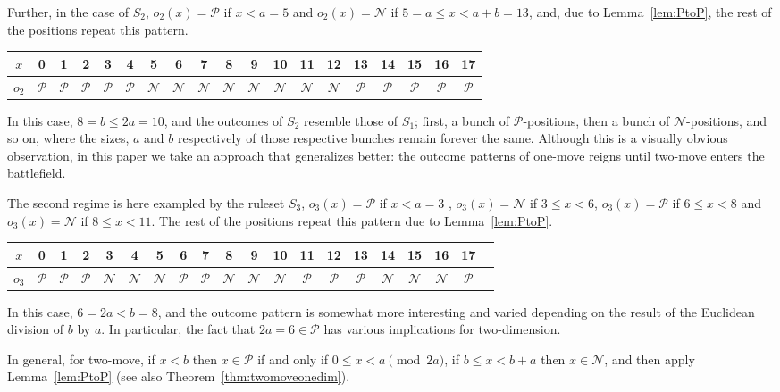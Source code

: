 \documentclass{amsart}
\theoremstyle{plain}
\theoremstyle{definition}
\newcommand{\N}{\ensuremath{\mathcal N}}
\renewcommand{\P}{\ensuremath{\mathcal P}}
\renewcommand{\le}{\leqslant}
\begin{document}
Further, in the case of $S_2$, $o_2(x) = \P$ if $x < a=5$ and $o_2(x) =\N $ if $5=a \le x < a+b=13$, and, due to Lemma~\ref{lem:PtoP},  the rest of the positions repeat this pattern.\vspace{2 mm} 
{\small
\begin{center}
\begin{tabular}{|c|c|c|c|c|c|c|c|c|c|c|c|c|c|c|c|c|c|c|}
\hline
 $x$ & 0 & 1 & 2 & 3 & 4 & 5 & 6 & 7 & 8 & 9 & 10 & 11 & 12 &13 &14 & 15 & 16 & 17\\ \hline
$o_2$ & \P  & \P & \P & \P & \P & \N & \N & \N & \N & \N & \N  & \N & \N & \P &\P& \P & \P &\P\\ \hline
\end{tabular}
\end{center}}\vspace{2 mm}

In this case, $8 = b\le 2a=10$, and the outcomes of $S_2$ resemble those of $S_1$; first, a bunch of \P-positions, then a bunch of \N-positions, and so on, where the sizes, $a$ and $b$ respectively of those respective bunches remain forever the same. Although this is a visually obvious observation, in this paper we take an approach that generalizes better: the outcome patterns of {\sc one-move} reigns until {\sc two-move} enters the battlefield.  

The second regime is here exampled by the ruleset $S_3$,  $o_3(x) =\P$ if $x < a=3$ , $o_3(x) =\N $ if $3 \le x <6$,  $o_3(x) =\P $ if $6 \le x <8$ and  $o_3(x) =\N $ if $8 \le x <11$. The rest of the positions repeat this pattern due to  Lemma~\ref{lem:PtoP}.\vspace{2 mm} 
{\small
\begin{center}
\begin{tabular}{|c|c|c|c|c|c|c|c|c|c|c|c|c|c|c|c|c|c|c|c|}
\hline
 $x$ & 0 & 1 & 2 & 3 & 4 & 5 & 6 & 7 & 8 & 9 &10 &11 &12 &13 &14 & 15 
 & 16 &17 \\ \hline
$o_3$ & \P  & \P & \P & \N & \N & \N & \P & \P & \N & \N & \N & \P  & \P & \P & \N & \N & \N  & \P \\ \hline
\end{tabular}
\end{center}}\vspace{2 mm} 
In this case, $6 = 2a< b = 8$, and the outcome pattern is somewhat more interesting and varied depending on the result of the Euclidean division of $b$ by $a$. In particular, the fact that $2a=6\in\P$ has various implications for {\sc two-dimension}. 

In general, for {\sc two-move}, if $x<b$ then $x\in \P$ if and only if $0\le x<a \pmod{2a}$, if $b\le x<b+a$ then $x\in \N$, and then apply Lemma~\ref{lem:PtoP} (see also Theorem~\ref{thm:twomoveonedim}). 
\end{document}
